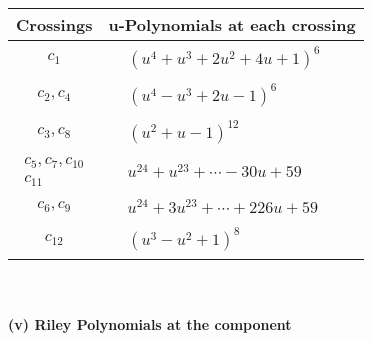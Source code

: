 \documentclass[1p]{elsarticle_modified}
\theoremstyle{definition}
\begin{document}
\begin{tabular}{m{50pt}|m{274pt}}
Crossings & \hspace{64pt}u-Polynomials at each crossing \\
\hline $$\begin{aligned}c_{1}\end{aligned}$$&$\begin{aligned}
&(u^4+u^3+2 u^2+4 u+1)^6
\end{aligned}$\\
\hline $$\begin{aligned}c_{2},c_{4}\end{aligned}$$&$\begin{aligned}
&(u^4- u^3+2 u-1)^6
\end{aligned}$\\
\hline $$\begin{aligned}c_{3},c_{8}\end{aligned}$$&$\begin{aligned}
&(u^2+u-1)^{12}
\end{aligned}$\\
\hline $$\begin{aligned}c_{5},c_{7},c_{10}\\c_{11}\end{aligned}$$&$\begin{aligned}
&u^{24}+u^{23}+\cdots-30 u+59
\end{aligned}$\\
\hline $$\begin{aligned}c_{6},c_{9}\end{aligned}$$&$\begin{aligned}
&u^{24}+3 u^{23}+\cdots+226 u+59
\end{aligned}$\\
\hline $$\begin{aligned}c_{12}\end{aligned}$$&$\begin{aligned}
&(u^3- u^2+1)^8
\end{aligned}$\\
\hline
\end{tabular}\\~\\
\newpage\renewcommand{\arraystretch}{1}
\flushleft \textbf{(v) Riley Polynomials at the component}\newline \\
\end{document}
